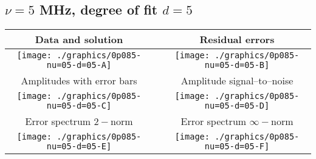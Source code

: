 

% 

\clearpage{}
\break{}

\subsection{$\nu = 5$ MHz, degree of fit $d = 5$}

\begin{table}[h]
    \begin{center}
        \begin{tabular}{ccc}
            Data and solution & \quad & Residual errors \\\hline
            \texttt{[image: ./graphics/0p085-nu=05-d=05-A]} &&
            \texttt{[image: ./graphics/0p085-nu=05-d=05-B]} \\[15pt]
            Amplitudes with error bars && Amplitude signal--to--noise \\\hline
            \texttt{[image: ./graphics/0p085-nu=05-d=05-C]} &&
            \texttt{[image: ./graphics/0p085-nu=05-d=05-D]} \\[15pt]
            Error spectrum $2-$norm && Error spectrum $\infty-$norm \\\hline
            \texttt{[image: ./graphics/0p085-nu=05-d=05-E]} &&
            \texttt{[image: ./graphics/0p085-nu=05-d=05-F]} \\[15pt]
        \end{tabular}
    \end{center}
\label{fig:elev=85, nu=5}
\end{table}



\endinput
